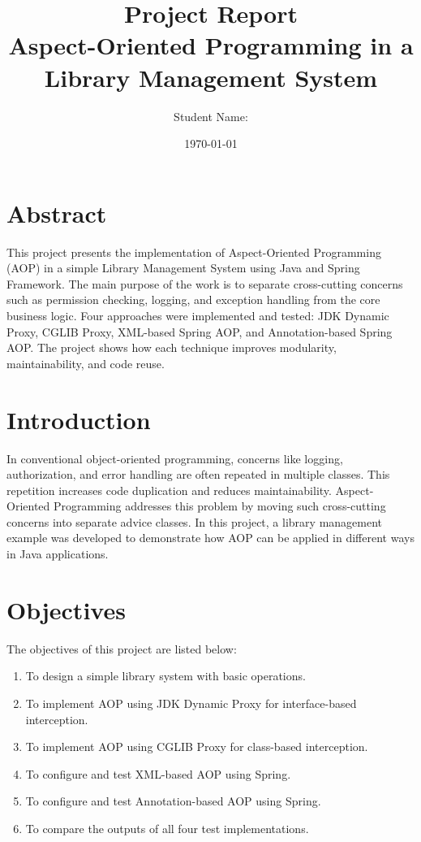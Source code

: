 \documentclass[12pt,a4paper]{article}
\title{\textbf{Project Report}\\Aspect-Oriented Programming in a Library Management System}
\author{Student Name: \underline{\hspace{2.4in}}}
\date{\today}
\begin{document}
\maketitle

\section*{Abstract}
This project presents the implementation of Aspect-Oriented Programming (AOP) in a simple Library Management System using Java and Spring Framework. The main purpose of the work is to separate cross-cutting concerns such as permission checking, logging, and exception handling from the core business logic. Four approaches were implemented and tested: JDK Dynamic Proxy, CGLIB Proxy, XML-based Spring AOP, and Annotation-based Spring AOP. The project shows how each technique improves modularity, maintainability, and code reuse.

\section*{Introduction}
In conventional object-oriented programming, concerns like logging, authorization, and error handling are often repeated in multiple classes. This repetition increases code duplication and reduces maintainability. Aspect-Oriented Programming addresses this problem by moving such cross-cutting concerns into separate advice classes. In this project, a library management example was developed to demonstrate how AOP can be applied in different ways in Java applications.

\section*{Objectives}
The objectives of this project are listed below:
\begin{enumerate}[label=\arabic*.]
    \item To design a simple library system with basic operations.
    \item To implement AOP using JDK Dynamic Proxy for interface-based interception.
    \item To implement AOP using CGLIB Proxy for class-based interception.
    \item To configure and test XML-based AOP using Spring.
    \item To configure and test Annotation-based AOP using Spring.
    \item To compare the outputs of all four test implementations.
\end{enumerate}
\end{document}
